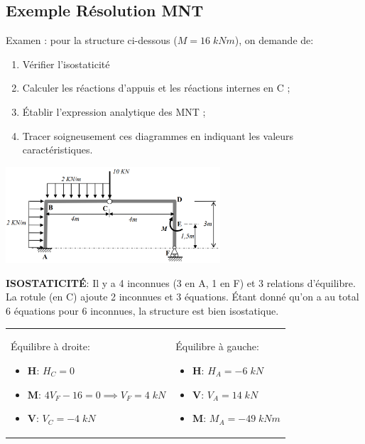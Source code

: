 \documentclass[a4paper]{article}
\begin{document}
\subsection{Exemple Résolution MNT}





Examen \big[2010-2011 S2 Q1\big]: pour la structure ci-dessous ($ M = 16 \; kN m $), on demande de:
\begin{enumerate}
    \item Vérifier l’isostaticité
    \item Calculer les réactions d’appuis et les réactions internes en C ;
    \item Établir l’expression analytique des MNT ;
    \item Tracer soigneusement ces diagrammes en indiquant les valeurs caractéristiques.
\end{enumerate}

\begin{center} \includegraphics[width=0.6\textwidth]{images/MNT02.PNG} \end{center}



\textbf{ISOSTATICITÉ}: Il y a 4 inconnues (3 en A, 1 en F) et 3 relations d'équilibre. La rotule (en C) ajoute 2 inconnues et 3 équations. Étant donné qu'on a au total 6 équations pour 6 inconnues, la structure est bien isostatique.



\begin{tabular}{p{8cm}p{6cm}}
Équilibre à droite:
\begin{itemize}
    \item \textbf{H}: $ H_C = 0 $
    \item \textbf{M}: $ 4 V_F - 16 = 0 \implies V_F = 4 \; kN $
    \item \textbf{V}: $ V_C = - 4 \; kN $
\end{itemize}
&
Équilibre à gauche:
\begin{itemize}
    \item \textbf{H}: $ H_A = - 6 \; kN $
    \item \textbf{V}: $ V_A = 14 \; kN $
    \item \textbf{M}: $ M_A = - 49 \; kN m $
\end{itemize}
\end{tabular}
\end{document}
